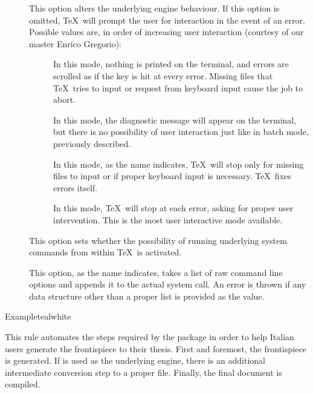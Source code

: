 \begin{description}
\begin{description}
\item[] This option alters the underlying engine behaviour. If this option is omitted, \TeX\ will prompt the user for interaction in the event of an error. Possible values are, in order of increasing user interaction (courtesy of our master Enrico Gregorio):

\begin{description}
\item[] In this mode, nothing is printed on the terminal, and errors are scrolled as if the  key is hit at every error. Missing files that \TeX\ tries to input or request from keyboard input cause the job to abort.

\item[] In this mode, the diagnostic message will appear on the terminal, but there is no possibility of user interaction just like in batch mode, previously described.

\item[] In this mode, as the name indicates, \TeX\ will stop only for missing files to input or if proper keyboard input is necessary. \TeX\ fixes errors itself.

\item[] In this mode, \TeX\ will stop at each error, asking for proper user intervention. This is the most user interactive mode available.
\end{description}

\item[] This option sets whether the possibility of running underlying system commands from within \TeX\ is activated.

\item[] This option, as the name indicates, takes a list of raw command line options and appends it to the actual system call. An error is thrown if any data structure other than a proper list is provided as the value.
\end{description}

\begin{codebox}{Example}{teal}{\icnote}{white}
\end{codebox}

\item[\rulebox{frontespizio}]
This rule automates the steps required by the  package in order to help Italian users generate the frontispiece to their thesis. First and foremost, the frontispiece is generated. If  is used as the underlying engine, there is an additional intermediate conversion step to a proper  file. Finally, the final document is compiled.


\end{description}
